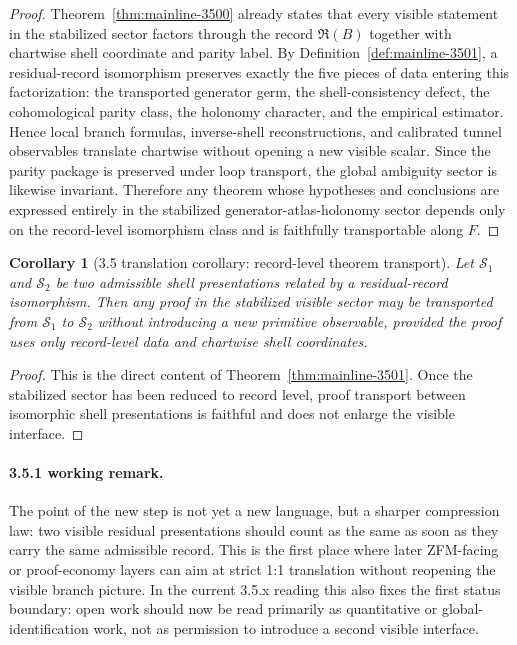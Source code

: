 \documentclass[12pt,a4paper]{article}
\newtheorem{corollary}[theorem]{Corollary}
\begin{document}
\begin{proof}
Theorem~\ref{thm:mainline-3500} already states that every visible statement in the stabilized sector factors through the record $\mathfrak R(B)$ together with chartwise shell coordinate and parity label. By Definition~\ref{def:mainline-3501}, a residual-record isomorphism preserves exactly the five pieces of data entering this factorization: the transported generator germ, the shell-consistency defect, the cohomological parity class, the holonomy character, and the empirical estimator. Hence local branch formulas, inverse-shell reconstructions, and calibrated tunnel observables translate chartwise without opening a new visible scalar. Since the parity package is preserved under loop transport, the global ambiguity sector is likewise invariant. Therefore any theorem whose hypotheses and conclusions are expressed entirely in the stabilized generator-atlas-holonomy sector depends only on the record-level isomorphism class and is faithfully transportable along $F$.
\end{proof}

\begin{corollary}[3.5 translation corollary: record-level theorem transport]
\label{cor:mainline-3501}
Let $\mathcal S_1$ and $\mathcal S_2$ be two admissible shell presentations related by a residual-record isomorphism. Then any proof in the stabilized visible sector may be transported from $\mathcal S_1$ to $\mathcal S_2$ without introducing a new primitive observable, provided the proof uses only record-level data and chartwise shell coordinates.
\end{corollary}

\begin{proof}
This is the direct content of Theorem~\ref{thm:mainline-3501}. Once the stabilized sector has been reduced to record level, proof transport between isomorphic shell presentations is faithful and does not enlarge the visible interface.
\end{proof}

\paragraph{3.5.1 working remark.}
The point of the new step is not yet a new language, but a sharper compression law: two visible residual presentations should count as the same as soon as they carry the same admissible record. This is the first place where later ZFM-facing or proof-economy layers can aim at strict 1:1 translation without reopening the visible branch picture. In the current 3.5.x reading this also fixes the first status boundary: open work should now be read primarily as quantitative or global-identification work, not as permission to introduce a second visible interface.
\end{document}
